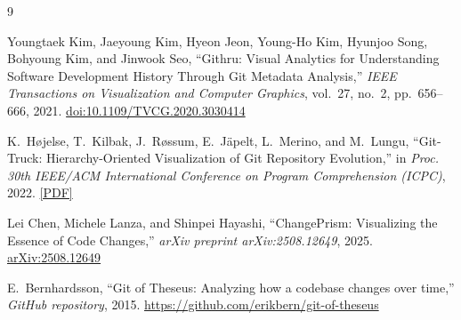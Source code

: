 \documentclass[12 pt]{article}
\begin{document}
\begin{thebibliography}{9}

Youngtaek Kim, Jaeyoung Kim, Hyeon Jeon, Young-Ho Kim, Hyunjoo Song, Bohyoung Kim, and Jinwook Seo,
``Githru: Visual Analytics for Understanding Software Development History Through Git Metadata Analysis,''
\textit{IEEE Transactions on Visualization and Computer Graphics}, vol.~27, no.~2, pp.~656--666, 2021.
\href{https://ieeexplore.ieee.org/document/9222261}{doi:10.1109/TVCG.2020.3030414}

K.~Højelse, T.~Kilbak, J.~Røssum, E.~Jäpelt, L.~Merino, and M.~Lungu,
``Git-Truck: Hierarchy-Oriented Visualization of Git Repository Evolution,''
in \textit{Proc. 30th IEEE/ACM International Conference on Program Comprehension (ICPC)}, 2022.
\href{https://mircealungu.com/docs/assets/papers/22-Git-Truck.pdf}{[PDF]}

Lei Chen, Michele Lanza, and Shinpei Hayashi,
``ChangePrism: Visualizing the Essence of Code Changes,''
\textit{arXiv preprint arXiv:2508.12649}, 2025.
\href{https://arxiv.org/abs/2508.12649}{arXiv:2508.12649}

E.~Bernhardsson,
``Git of Theseus: Analyzing how a codebase changes over time,''
\textit{GitHub repository}, 2015.
\href{https://github.com/erikbern/git-of-theseus}{https://github.com/erikbern/git-of-theseus}

\end{thebibliography}
\end{document}
